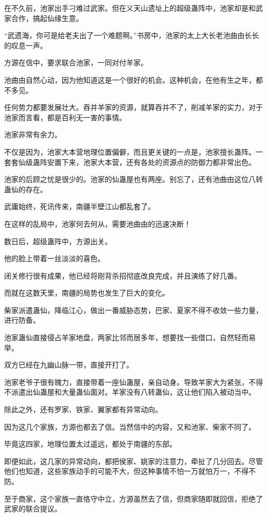 \begin{this_body}
在不久前，池家出手刁难过武家。但在义天山遗址上的超级蛊阵中，池家却是和武家合作，搞起仙缘生意。

“武遗海，你可是给老夫出了一个难题啊。”书房中，池家的太上大长老池曲由长长的叹息一声。

方源在信中，要求联合池家，一同对付羊家。

池曲由自然心动，因为他知道这是一个很好的机会。这种机会，在他有生之年，都不多见。

任何势力都要发展壮大。吞并羊家的资源，就算吞并不了，削减羊家的实力，对于池家而言看，都是百利无一害的事情。

池家非常有余力。

不仅是因为，池家大本营地理位置偏僻，而且更关键的一点是，池家擅长蛊阵。一套套仙级蛊阵安置下来，池家大本营，还有各处的资源点的防御力都非常出色。

池家的后顾之忧是很少的。池家的仙蛊屋也有两座。别忘了，还有池曲由这位八转蛊仙的存在。

武庸始终，死讯传来，南疆半壁江山都乱套了。

在这样的乱局中，池家何去何从，需要池曲由的迅速决断！

数日后，超级蛊阵中，方源出关。

他的脸上带着一丝淡淡的喜色。

闭关修行很有成果，他已经将刚背杀招彻底改良完成，并且演练了好几番。

而就在这数天里，南疆的局势也发生了巨大的变化。

柴家派遣蛊仙，降临江心，做出一番威胁态势，巴家、夏家不得不收敛一些力量，进行防备。

池家蛊仙直接侵占羊家地盘，两家比邻而居多年，想要找一些借口，自然轻而易举。

双方已经在九幽山脉一带，直接开打了。

池家老爷子很有魄力，直接带着一座仙蛊屋，亲自动身。导致羊家大为紧张，不得不派遣出仙蛊屋和大量蛊仙面对。羊家没有八转蛊仙，这让他们陷入被动当中。

除此之外，还有罗家、铁家、翼家都有异常动向。

因为这几个家族，方源也都去了信。当然信中的内容，又和池家、柴家不同了。

毕竟这四家，地理位置太过遥远，都处于南疆的东部。

即便如此，这几家的异常动向，都把侯家、姚家的注意力，牵扯了几分回去。尽管他们也知道，这些家族动手的可能不大，但这种事情不怕一万就怕万一，不得不防。

至于商家，这个家族一直恪守中立，方源虽然去了信，但商家随即就回信，拒绝了武家的联合提议。


\end{this_body}
